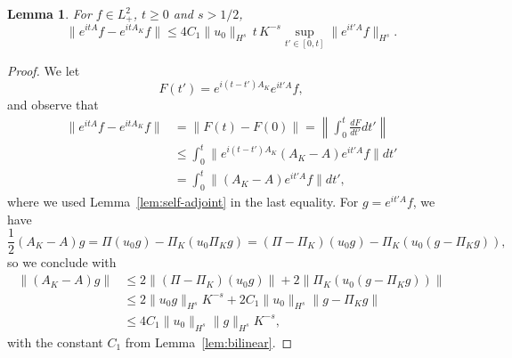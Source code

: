 \documentclass [11pt] {article}
\newtheorem{lem}[thm]{Lemma}
\begin{document}
\begin{lem}
\label{lem:diff-exp}
For $f\in L^2_+$, $t\geq 0$ and $s>1/2$,
\[
\|e^{itA}f-e^{itA_K}f\|\leq 4C_1\|u_0\|_{H^s}\,t\,K^{-s} \sup_{t'\in[0,t]}\|e^{it'A}f\|_{H^s}.
\]
\end{lem}
\begin{proof}
We let
\[
F(t')=e^{i(t-t')A_K}e^{it'A}f,
\]
and observe that
\begin{align*}
\|e^{itA}f-e^{itA_K}f\|
&=\|F(t)-F(0)\|=\left\|\int_0^t \frac{dF}{dt'}dt'\right\|\\
&\leq \int_0^t\|e^{i(t-t')A_K}(A_K-A)e^{it'A}f\|dt'\\
&= \int_0^t\|(A_K-A)e^{it'A}f\|dt',
\end{align*}
where we used Lemma~\ref{lem:self-adjoint} in the last equality.
For $g=e^{it'A}f$, we have
\[
\frac{1}{2}(A_K-A)g=\Pi(u_0g)-\Pi_K(u_0\Pi_Kg)=(\Pi-\Pi_K)(u_0g)-\Pi_K(u_0(g-\Pi_Kg)),
\]
so we conclude with
\begin{align*}
\|(A_K-A)g\| 
&\leq 2\|(\Pi-\Pi_K)(u_0g)\|+2\|\Pi_K(u_0(g-\Pi_Kg))\| \\
&\leq 2\|u_0g\|_{H^s}K^{-s}+2C_1\|u_0\|_{H^s}\|g-\Pi_Kg\| \\
&\leq 4C_1\|u_0\|_{H^s}\|g\|_{H^s}K^{-s},
\end{align*}
with the constant $C_1$ from Lemma~\ref{lem:bilinear}.
\end{proof}
\end{document}
